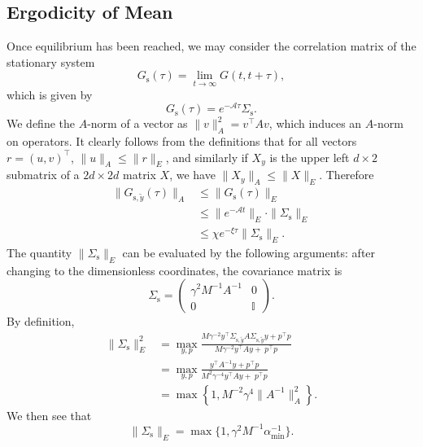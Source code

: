 \documentclass[prx,onecolumn,floatfix,longbibliography,notitlepage, nofootinbib]{revtex4-1}
\renewcommand{\leq}{\leqslant}
\begin{document}
\begin{appendix}
\subsection{Ergodicity of Mean}
Once equilibrium has been reached, we may consider the correlation matrix of the stationary system
\begin{equation}
    G_\text{s}(\tau) = \lim_{t\to\infty}G(t,t+\tau),
\end{equation}
which is given by
\begin{equation}
    G_\text{s}(\tau) = e^{-\mathcal{A} \tau}\Sigma_\text{s}.
\end{equation}
We define the $A$-norm of a vector as $\|v\|_A ^2 = v^\intercal A v$, which induces an $A$-norm on operators. It clearly follows from the definitions that for all vectors $r = (u, v)^\intercal$, $\|u\|_A \leq \|r\|_E$, and similarly if $X_{y}$ is the upper left $d \times 2$ submatrix of a $2  d \times 2d$ matrix $X$, we have $\|X_{y}\|_A \leq \|X\|_E$.
Therefore
\begin{align}
    \|G_{\text{s},\tilde{y}}(\tau)\|_A &\leq \|G_\text{s}(\tau)\|_E\\
    & \leq \|e^{-\mathcal{A} t}\|_E \cdot \| \Sigma_\text{s}\|_E \\
    & \leq  \chi e^{-\xi \tau} \|\Sigma_\text{s}\|_E.
\end{align}
The quantity $\|\Sigma_\text{s}\|_E$ can be evaluated by the following arguments: after changing to the dimensionless coordinates, the covariance matrix is
\begin{equation}
    \Sigma_\text{s} = 
    \begin{pmatrix}
        \gamma^2 M^{-1} A^{-1} & 0\\
        0 & \mathbb{I}
    \end{pmatrix}.
\end{equation}
By definition,
\begin{align}
    \|\Sigma_\text{s}\|_E^2 &= \max_{y,p} \frac{ M \gamma^{-2}y^\intercal \Sigma_{\text{s},\tilde{y}} A \Sigma_{\text{s},\tilde{y}} y  + p^\intercal p}{M \gamma^{-2} y^\intercal A y + \ p^\intercal p} \\
    & = 
    \max_{y,p} \frac{ y^\intercal  A^{-1}y  + p^\intercal p}{M^2 \gamma^{-4} y^\intercal A y + \ p^\intercal p} \\
    & = 
    \max\left\{1, M^{-2}\gamma^{4}\|A^{-1}\|_A^2\right\}.
\end{align}
We then see that
\begin{equation}
    \|\Sigma_\text{s}\|_E = \max\{1, \gamma^{2} M^{-1} \alpha_\text{min}^{-1}\}.

\end{equation}
\end{appendix}
\end{document}
